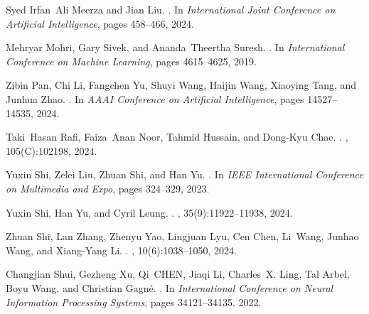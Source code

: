 \documentclass{article}
\begin{document}
\begin{thebibliography}{}
Syed Irfan~Ali Meerza and Jian Liu.
.
\newblock In {\em {International Joint Conference on Artificial Intelligence}}, pages 458--466, 2024.

Mehryar Mohri, Gary Sivek, and Ananda~Theertha Suresh.
.
\newblock In {\em {International Conference on Machine Learning}}, pages 4615--4625, 2019.

Zibin Pan, Chi Li, Fangchen Yu, Shuyi Wang, Haijin Wang, Xiaoying Tang, and Junhua Zhao.
.
\newblock In {\em AAAI Conference on Artificial Intelligence}, pages 14527--14535, 2024.

Taki~Hasan Rafi, Faiza~Anan Noor, Tahmid Hussain, and Dong-Kyu Chae.
.
, 105(C):102198, 2024.

Yuxin Shi, Zelei Liu, Zhuan Shi, and Han Yu.
.
\newblock In {\em {IEEE International Conference on Multimedia and Expo}}, pages 324--329, 2023.

Yuxin Shi, Han Yu, and Cyril Leung.
.
, 35(9):11922--11938, 2024.

Zhuan Shi, Lan Zhang, Zhenyu Yao, Lingjuan Lyu, Cen Chen, Li~Wang, Junhao Wang, and Xiang-Yang Li.
.
, 10(6):1038--1050, 2024.

Changjian Shui, Gezheng Xu, Qi~CHEN, Jiaqi Li, Charles~X. Ling, Tal Arbel, Boyu Wang, and Christian Gagn\'{e}.
.
\newblock In {\em {International Conference on Neural Information Processing Systems}}, pages 34121--34135, 2022.


\end{thebibliography}
\end{document}
